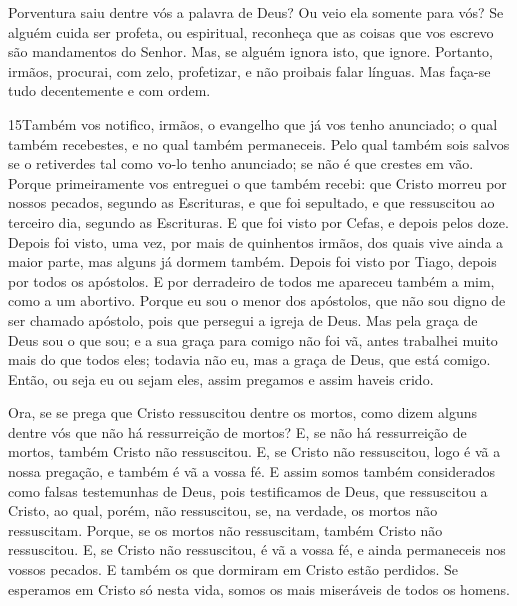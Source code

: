 Porventura saiu dentre vós a palavra de Deus? Ou veio ela somente
para vós? Se alguém cuida ser profeta, ou espiritual,
reconheça que as coisas que vos escrevo são mandamentos do Senhor.
Mas, se alguém ignora isto, que ignore. Portanto,
irmãos, procurai, com zelo, profetizar, e não proibais falar
línguas. Mas faça-se tudo decentemente e com ordem.

\medskip

\lettrine{15} Também vos notifico, irmãos, o evangelho que já
vos tenho anunciado; o qual também recebestes, e no qual também
permaneceis. Pelo qual também sois salvos se o retiverdes tal
como vo-lo tenho anunciado; se não é que crestes em vão. Porque
primeiramente vos entreguei o que também recebi: que Cristo morreu
por nossos pecados, segundo as Escrituras, e que foi sepultado,
e que ressuscitou ao terceiro dia, segundo as Escrituras. E que
foi visto por Cefas, e depois pelos doze. Depois foi visto, uma
vez, por mais de quinhentos irmãos, dos quais vive ainda a maior
parte, mas alguns já dormem também. Depois foi visto por Tiago,
depois por todos os apóstolos. E por derradeiro de todos me
apareceu também a mim, como a um abortivo. Porque eu sou o menor
dos apóstolos, que não sou digno de ser chamado apóstolo, pois que
persegui a igreja de Deus. Mas pela graça de Deus sou o que
sou; e a sua graça para comigo não foi vã, antes trabalhei muito
mais do que todos eles; todavia não eu, mas a graça de Deus, que
está comigo. Então, ou seja eu ou sejam eles, assim pregamos
e assim haveis crido.

Ora, se se prega que Cristo ressuscitou dentre os mortos, como
dizem alguns dentre vós que não há ressurreição de mortos? E,
se não há ressurreição de mortos, também Cristo não ressuscitou.
E, se Cristo não ressuscitou, logo é vã a nossa pregação, e
também é vã a vossa fé. E assim somos também considerados
como falsas testemunhas de Deus, pois testificamos de Deus, que
ressuscitou a Cristo, ao qual, porém, não ressuscitou, se, na
verdade, os mortos não ressuscitam. Porque, se os mortos não
ressuscitam, também Cristo não ressuscitou. E, se Cristo não
ressuscitou, é vã a vossa fé, e ainda permaneceis nos vossos
pecados. E também os que dormiram em Cristo estão perdidos.
Se esperamos em Cristo só nesta vida, somos os mais
miseráveis de todos os homens.

